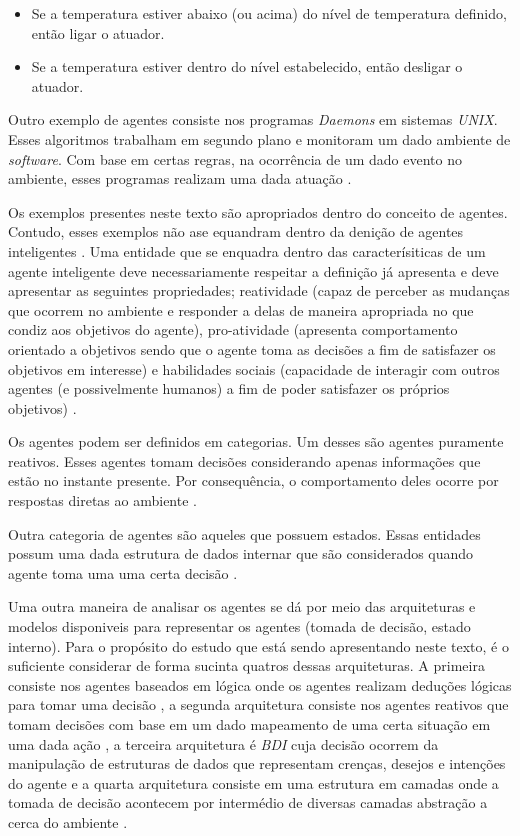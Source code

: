 \begin{itemize}
    \item Se a temperatura estiver abaixo (ou acima) do nível de temperatura definido, então ligar o atuador.
    \item Se a temperatura estiver dentro do nível estabelecido, então desligar o atuador.
\end{itemize}

Outro exemplo de agentes consiste nos programas \textit{Daemons} em sistemas \textit{UNIX}. Esses algoritmos trabalham em segundo plano e monitoram um dado ambiente de \textit{software}. Com base
em certas regras, na ocorrência de um dado evento no ambiente, esses programas realizam uma dada atuação \cite{whatisagent}.   

Os exemplos presentes neste texto são apropriados dentro do conceito de agentes. Contudo, esses exemplos não ase equandram dentro da denição de agentes inteligentes \cite{whatisagent}. Uma entidade que se enquadra
dentro das caracterísiticas de um agente inteligente deve necessariamente respeitar a definição já apresenta e deve apresentar as seguintes propriedades; reatividade (capaz de perceber as mudanças
que ocorrem no ambiente e responder a delas de maneira apropriada no que condiz aos objetivos do agente), pro-atividade (apresenta comportamento orientado a objetivos sendo que o agente toma as decisões
a fim de satisfazer os objetivos em interesse) e habilidades sociais (capacidade de interagir com outros agentes (e possivelmente humanos) a fim de poder satisfazer os próprios objetivos) \cite{whatisagent} \cite{artificialinteligencemodermapproach}.

Os agentes podem ser definidos em categorias. Um desses são agentes puramente reativos. Esses agentes tomam decisões considerando apenas informações que estão no instante presente. Por consequência, 
o comportamento deles ocorre por respostas diretas ao ambiente \cite{whatisagent}. 

Outra categoria de agentes são aqueles que possuem estados. Essas entidades possum uma dada estrutura de dados internar que são considerados quando agente toma uma uma certa decisão \cite{whatisagent}.

Uma outra maneira de analisar os agentes se dá por meio das arquiteturas e modelos disponiveis para representar os agentes (tomada de decisão, estado interno). Para o propósito do estudo que está
sendo apresentando neste texto, é o suficiente considerar de forma sucinta quatros dessas arquiteturas. A primeira consiste nos agentes baseados em lógica onde os agentes realizam deduções lógicas
para tomar uma decisão \cite{logicagent}, a segunda arquitetura consiste nos agentes reativos que tomam decisões com base em um dado mapeamento de uma certa situação em uma dada ação \cite{reactiveagent}, a terceira arquitetura é \textit{BDI}
cuja decisão ocorrem da manipulação de estruturas de dados que representam crenças, desejos e intenções do agente \cite{bdi} e a quarta arquitetura consiste em uma estrutura em camadas onde a tomada de decisão
acontecem por intermédio de diversas camadas abstração a cerca do ambiente \cite{layeragent} \cite{whatisagent}.  